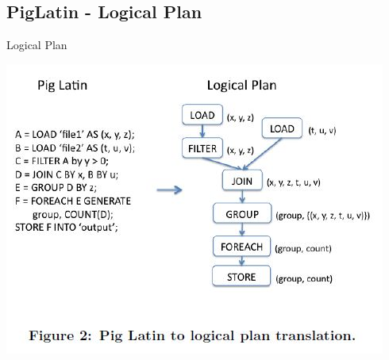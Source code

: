 
\subsection{PigLatin - Logical Plan}
\begin{frame}{Logical Plan}
\centerline{\includegraphics[scale=0.55]{Images/PigLatin.JPG}}
\let\thefootnote\relax{}
\end{frame}


